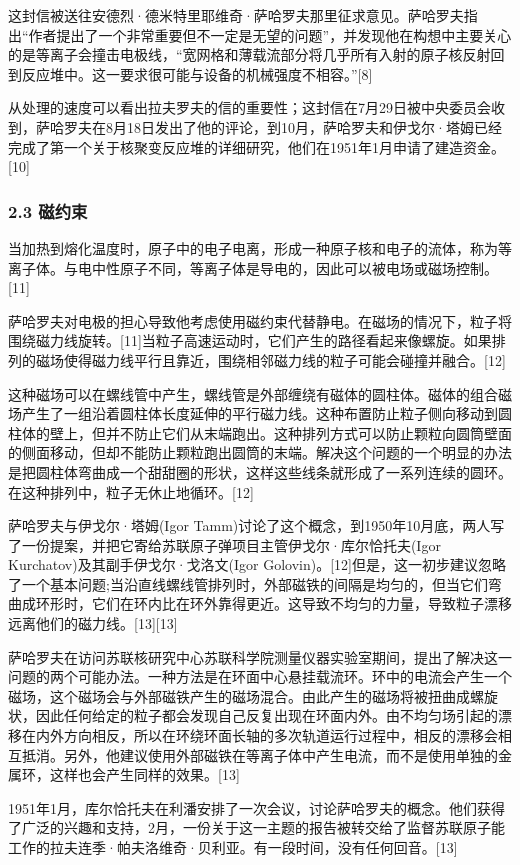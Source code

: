 这封信被送往安德烈·德米特里耶维奇·萨哈罗夫那里征求意见。萨哈罗夫指出“作者提出了一个非常重要但不一定是无望的问题”，并发现他在构想中主要关心的是等离子会撞击电极线，“宽网格和薄载流部分将几乎所有入射的原子核反射回到反应堆中。这一要求很可能与设备的机械强度不相容。”[8]

从处理的速度可以看出拉夫罗夫的信的重要性；这封信在7月29日被中央委员会收到，萨哈罗夫在8月18日发出了他的评论，到10月，萨哈罗夫和伊戈尔·塔姆已经完成了第一个关于核聚变反应堆的详细研究，他们在1951年1月申请了建造资金。[10]
\subsubsection{2.3 磁约束}
当加热到熔化温度时，原子中的电子电离，形成一种原子核和电子的流体，称为等离子体。与电中性原子不同，等离子体是导电的，因此可以被电场或磁场控制。[11]

萨哈罗夫对电极的担心导致他考虑使用磁约束代替静电。在磁场的情况下，粒子将围绕磁力线旋转。[11]当粒子高速运动时，它们产生的路径看起来像螺旋。如果排列的磁场使得磁力线平行且靠近，围绕相邻磁力线的粒子可能会碰撞并融合。[12]

这种磁场可以在螺线管中产生，螺线管是外部缠绕有磁体的圆柱体。磁体的组合磁场产生了一组沿着圆柱体长度延伸的平行磁力线。这种布置防止粒子侧向移动到圆柱体的壁上，但并不防止它们从末端跑出。这种排列方式可以防止颗粒向圆筒壁面的侧面移动，但却不能防止颗粒跑出圆筒的末端。解决这个问题的一个明显的办法是把圆柱体弯曲成一个甜甜圈的形状，这样这些线条就形成了一系列连续的圆环。在这种排列中，粒子无休止地循环。[12]

萨哈罗夫与伊戈尔·塔姆(Igor Tamm)讨论了这个概念，到1950年10月底，两人写了一份提案，并把它寄给苏联原子弹项目主管伊戈尔·库尔恰托夫(Igor Kurchatov)及其副手伊戈尔·戈洛文(Igor Golovin)。[12]但是，这一初步建议忽略了一个基本问题;当沿直线螺线管排列时，外部磁铁的间隔是均匀的，但当它们弯曲成环形时，它们在环内比在环外靠得更近。这导致不均匀的力量，导致粒子漂移远离他们的磁力线。[13][13]

萨哈罗夫在访问苏联核研究中心苏联科学院测量仪器实验室期间，提出了解决这一问题的两个可能办法。一种方法是在环面中心悬挂载流环。环中的电流会产生一个磁场，这个磁场会与外部磁铁产生的磁场混合。由此产生的磁场将被扭曲成螺旋状，因此任何给定的粒子都会发现自己反复出现在环面内外。由不均匀场引起的漂移在内外方向相反，所以在环绕环面长轴的多次轨道运行过程中，相反的漂移会相互抵消。另外，他建议使用外部磁铁在等离子体中产生电流，而不是使用单独的金属环，这样也会产生同样的效果。[13]

1951年1月，库尔恰托夫在利潘安排了一次会议，讨论萨哈罗夫的概念。他们获得了广泛的兴趣和支持，2月，一份关于这一主题的报告被转交给了监督苏联原子能工作的拉夫连季·帕夫洛维奇·贝利亚。有一段时间，没有任何回音。[13]
